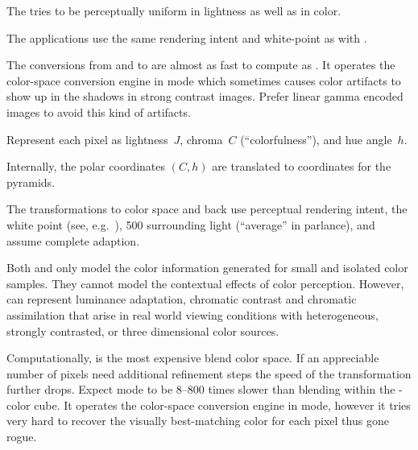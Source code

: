 \begin{description}
  The  tries to be perceptually uniform in lightness as well as in color.

  The applications use the same rendering intent and white-point as with .

  The conversions from and to  are almost as fast to compute as
  .  It operates the  color-space conversion engine in
   mode which sometimes causes color artifacts to
  show up in the shadows in strong contrast images.  Prefer linear gamma encoded images to avoid
  this kind of artifacts.

\item[\urlmark{\wikipediaciecam}{\acronym{CIECAM02}}]\itemend\urltext
  Represent each pixel as lightness~$J$, chroma~$C$ (``colorfulness''), and hue
  angle~$h$.

  \begin{geeknote}
    Internally, the polar coordinates $(C, h)$ are translated to 
    coordinates for the pyramids.
  \end{geeknote}

  The transformations to  color space and back use perceptual rendering
  intent, the  white point (see, e.g.\ ), 500 surrounding light (``average'' in  parlance),
  and assume complete adaption.

  Both  and  only model the color information generated for
  small and isolated color samples.  They cannot model the contextual effects of color
  perception.  However,  can represent luminance adaptation, chromatic
  contrast and chromatic assimilation that arise in real world viewing conditions with
  heterogeneous, strongly contrasted, or three dimensional color sources.

  Computationally,  is the most expensive blend color space.  If an
  appreciable number of pixels need additional refinement steps the speed of the transformation
  further drops.  Expect  mode to be 8--800 times slower than blending within
  the -color cube.  It operates the  color-space conversion
  engine in  mode, however it tries very hard to
  recover the visually best-matching color for each pixel thus gone rogue.
\end{description}

